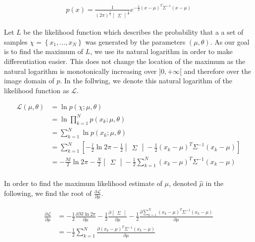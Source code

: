 \documentclass[a4paper, 10pt, twoside]{article}
\begin{document}
\begin{align*}
    p(x) =
    \frac{1}{(2\pi)^\frac{l}{2} \begin{vmatrix} \Sigma \end{vmatrix}^\frac{1}{2}}
    e^{-\frac{1}{2} (x-\mu)^T \Sigma^{-1} (x-\mu)}
\end{align*}

Let $L$ be the likelihood function which describes the probability that a a set of samples $\chi = \left\{x_1, \dots, x_N\right\}$ was generated by the parameters $(\mu, \theta)$. As our goal is to find the maximum of $L$, we use its natural logarithm in order to make differentiation easier. This does not change the location of the maximum as the natural logarithm is monotonically increasing over $]0, +\infty$[ and therefore over the image domain of $p$. In the follwing, we denote this natural logarithm of the likelihood function as $\mathcal{L}$.

\begin{align*}
    \mathcal{L}(\mu, \theta)
     & = \ln p(\chi; \mu, \theta)                                                                                                               \\
     & = \ln \prod_{k=1}^N p(x_k; \mu, \theta)                                                                                                  \\
     & = \sum_{k=1}^N \ln p(x_k; \mu, \theta)                                                                                                   \\
     & = \sum_{k=1}^N \left[-\frac{l}{2} \ln 2\pi -\frac{1}{2} \begin{vmatrix} \Sigma \end{vmatrix} -\frac{1}{2} (x_k-\mu)^T \Sigma^{-1} (x_k-\mu)\right] \\
     & = -\frac{Nl}{2} \ln 2\pi -\frac{N}{2} \begin{vmatrix} \Sigma \end{vmatrix} -\frac{1}{2} \sum_{k=1}^N (x_k-\mu)^T \Sigma^{-1} (x_k-\mu)             \\
\end{align*}

In order to find the maximum likelihood estimate of $\mu$, denoted $\hat{\mu}$ in the following, we find the root of $\frac{\partial \mathcal{L}}{\partial \mu}$.

\begin{align*}
    \frac{\partial \mathcal{L}}{\partial \mu}
     & =
    -\frac{1}{2} \frac{\partial{Nl \ln 2\pi}}{\partial \mu}
    -\frac{1}{2} \frac{\partial \begin{vmatrix} \Sigma \end{vmatrix}}{\partial \mu}
    -\frac{1}{2} \frac{\partial \sum_{k=1}^N (x_k-\mu)^T \Sigma^{-1} (x_k-\mu)}{\partial \mu} \\
     & =
    -\frac{1}{2} \sum_{k=1}^N \frac{\partial (x_k-\mu)^T \Sigma^{-1} (x_k-\mu)}{\partial \mu}
\end{align*}
\end{document}
